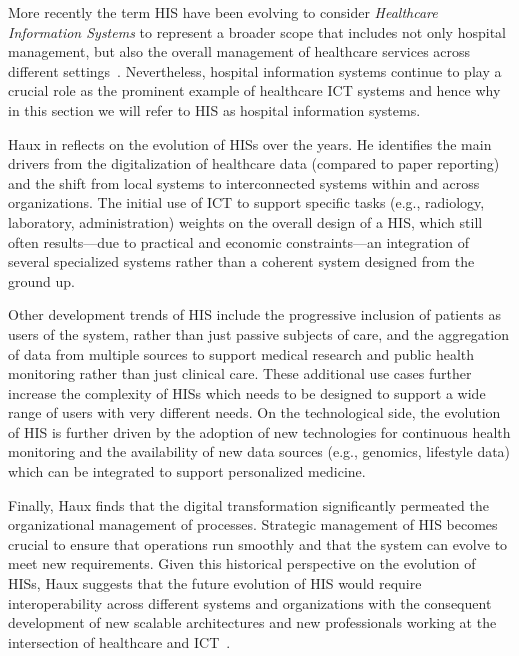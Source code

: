 More recently the term \ac{HIS} have been evolving to consider \emph{Healthcare Information Systems} to represent a broader scope that includes not only hospital management, but also the overall management of healthcare services across different settings~\cite{Kuhn_Giuse_2001}.
%
Nevertheless, hospital information systems continue to play a crucial role as the prominent example of healthcare \ac{ICT} systems and hence why in this section we will refer to \ac{HIS} as hospital information systems.

Haux in \cite{Haux_2006} reflects on the evolution of \acp{HIS} over the years.
%
He identifies the main drivers from the digitalization of healthcare data (compared to paper reporting) and the shift from local systems to interconnected systems within and across organizations. 
%
The initial use of \ac{ICT} to support specific tasks (e.g., radiology, laboratory, administration) weights on the overall design of a \ac{HIS}, which still often results---due to practical and economic constraints---an integration of several specialized systems rather than a coherent system designed from the ground up.

Other development trends of \ac{HIS} include the progressive inclusion of patients as users of the system, rather than just passive subjects of care, and the aggregation of data from multiple sources to support medical research and public health monitoring rather than just clinical care.
%
These additional use cases further increase the complexity of \acp{HIS} which needs to be designed to support a wide range of users with very different needs. 
%
On the technological side, the evolution of \ac{HIS} is further driven by the adoption of new technologies for continuous health monitoring and the availability of new data sources (e.g., genomics, lifestyle data) which can be integrated to support personalized medicine.

Finally, Haux finds that the digital transformation significantly permeated the organizational management of processes. Strategic management of \ac{HIS} becomes crucial to ensure that operations run smoothly and that the system can evolve to meet new requirements. 
%
Given this historical perspective on the evolution of \acp{HIS}, Haux suggests that the future evolution of \ac{HIS} would require interoperability across different systems and organizations with the consequent development of new scalable architectures and new professionals working at the intersection of healthcare and \ac{ICT}~\cite{Haux_2006}.

